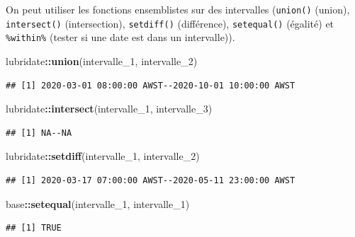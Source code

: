 \documentclass[
  11pt,
]{book}
\newenvironment{Shaded}{\begin{snugshade}}{\end{snugshade}}
\newcommand{\DecValTok}[1]{\textcolor[rgb]{0.00,0.00,0.81}{#1}}
\newcommand{\KeywordTok}[1]{\textcolor[rgb]{0.13,0.29,0.53}{\textbf{#1}}}
\newcommand{\NormalTok}[1]{#1}
\newcommand{\OperatorTok}[1]{\textcolor[rgb]{0.81,0.36,0.00}{\textbf{#1}}}
\numberwithin{equation}{section}
\numberwithin{countremarque}{section}
\begin{document}
On peut utiliser les fonctions ensemblistes sur des intervalles (\texttt{union()} (union), \texttt{intersect()} (intersection), \texttt{setdiff()} (différence), \texttt{setequal()} (égalité) et \texttt{\%within\%} (tester si une date est dans un intervalle)).

\begin{Shaded}
\begin{Highlighting}[]
\NormalTok{lubridate}\OperatorTok{::}\KeywordTok{union}\NormalTok{(intervalle\_}\DecValTok{1}\NormalTok{, intervalle\_}\DecValTok{2}\NormalTok{)}
\end{Highlighting}
\end{Shaded}

\begin{lstlisting}
## [1] 2020-03-01 08:00:00 AWST--2020-10-01 10:00:00 AWST
\end{lstlisting}

\begin{Shaded}
\begin{Highlighting}[]
\NormalTok{lubridate}\OperatorTok{::}\KeywordTok{intersect}\NormalTok{(intervalle\_}\DecValTok{1}\NormalTok{, intervalle\_}\DecValTok{3}\NormalTok{)}
\end{Highlighting}
\end{Shaded}

\begin{lstlisting}
## [1] NA--NA
\end{lstlisting}

\begin{Shaded}
\begin{Highlighting}[]
\NormalTok{lubridate}\OperatorTok{::}\KeywordTok{setdiff}\NormalTok{(intervalle\_}\DecValTok{1}\NormalTok{, intervalle\_}\DecValTok{2}\NormalTok{)}
\end{Highlighting}
\end{Shaded}

\begin{lstlisting}
## [1] 2020-03-17 07:00:00 AWST--2020-05-11 23:00:00 AWST
\end{lstlisting}

\begin{Shaded}
\begin{Highlighting}[]
\NormalTok{base}\OperatorTok{::}\KeywordTok{setequal}\NormalTok{(intervalle\_}\DecValTok{1}\NormalTok{, intervalle\_}\DecValTok{1}\NormalTok{)}
\end{Highlighting}
\end{Shaded}

\begin{lstlisting}
## [1] TRUE
\end{lstlisting}
\end{document}
